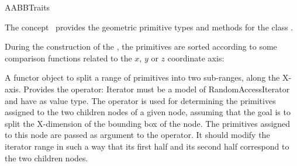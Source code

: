 \ccRefPageBegin


\begin{ccRefConcept}{AABBTraits}


\ccDefinition
  
The concept \ccRefName\ provides the geometric primitive types and methods for the class .

\ccTypes









During the construction of the , the primitives are sorted according to some comparison functions related to the $x$, $y$ or $z$ coordinate axis:

{A functor object to split a range of primitives into two sub-ranges, along the X-axis. Provides the operator:
 Iterator  must be a model of RandomAccessIterator and have  as value type. The operator is used for determining the primitives assigned to the two children nodes of a given node, assuming that the goal is to split the X-dimension of the bounding box of the node. The primitives assigned to this node are passed as argument to the operator. It should modify the iterator range in such a way that its first half and its second half correspond to the two children nodes.}


\end{ccRefConcept}
